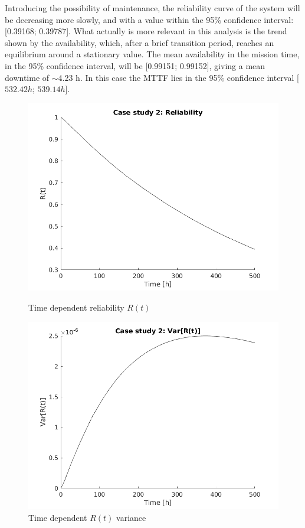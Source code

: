 \documentclass[a4paper,11pt]{article}
\begin{document}
Introducing the possibility of maintenance, the reliability curve of the system
will be decreasing more slowly, and with a value within the 95\% confidence
interval: [0.39168; 0.39787]. What actually is more relevant in this analysis is
the trend shown by the availability, which, after a brief transition period,
reaches an equilibrium around a stationary value. The mean availability in the
mission time, in the 95\% confidence interval, will be [0.99151; 0.99152],
giving a mean downtime of $\sim$4.23 h. In this case the MTTF lies in the 95\%
confidence interval [$532.42h$; $539.14h$].

\begin{figure}[ht]
    \centering
    \begin{minipage}{.5\textwidth}
        \centering
        \includegraphics[width=1\linewidth]{Rel2.png}
        \caption{Time dependent reliability $R(t)$}
    \end{minipage}%
    \begin{minipage}{.5\textwidth}
        \centering
        \includegraphics[width=1\linewidth]{Rel2_var.png}
        \caption{Time dependent $R(t)$ variance}
    \end{minipage}
\end{figure}
\end{document}
